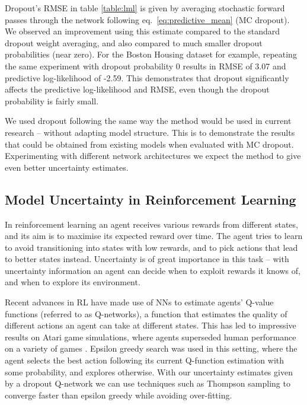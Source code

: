 \documentclass{article}
\theoremstyle{definition}
\begin{document}
Dropout's RMSE in table \ref{table:lml} is given by averaging stochastic forward passes through the network following eq.\ \eqref{eq:predictive_mean} (MC dropout).
We observed an improvement using this estimate compared to the standard dropout weight averaging, and also compared to much smaller dropout probabilities (near zero). 
For the Boston Housing dataset for example, repeating the same experiment with dropout probability 0 results in RMSE of 3.07 and predictive log-likelihood of -2.59.
This demonstrates that dropout significantly affects the predictive log-likelihood and RMSE, even though the dropout probability is fairly small.

We used dropout following the same way the method would be used in current research -- without adapting model structure. This is to demonstrate the results that could be obtained from existing models when evaluated with MC dropout. Experimenting with different network architectures we expect the method to give even better uncertainty estimates.


\subsection{Model Uncertainty in Reinforcement Learning}

In reinforcement learning an agent receives various rewards from different states, and its aim is to maximise its expected reward over time.
The agent tries to learn to avoid transitioning into states with low rewards, and to pick actions that lead to better states instead.
Uncertainty is of great importance in this task -- with uncertainty information an agent can decide when to exploit rewards it knows of, and when to explore its environment. 

Recent advances in RL have made use of NNs to estimate agents' Q-value functions (referred to as Q-networks), a function that estimates the quality of different actions an agent can take at different states.
This has led to impressive results on Atari game simulations, where agents superseded human performance on a variety of games \citep{mnih2015human}. 
Epsilon greedy search was used in this setting, where the agent selects the best action following its current Q-function estimation with some probability, and explores otherwise. With our uncertainty estimates given by a dropout Q-network we can use techniques such as Thompson sampling \citep{thompson1933likelihood} to converge faster than epsilon greedy while avoiding over-fitting. 
\end{document}
